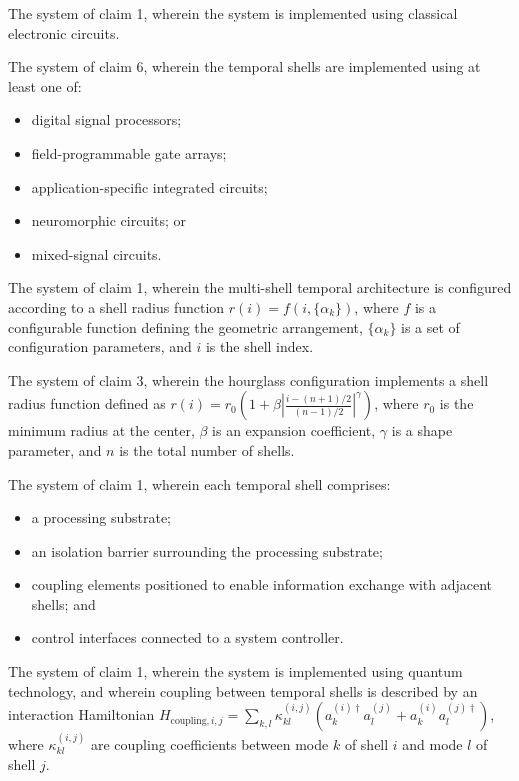 \documentclass[12pt,letterpaper]{article}
\begin{document}
\begin{patentclaims}
    \item The system of claim 1, wherein the system is implemented using classical electronic circuits.
    
    \item The system of claim 6, wherein the temporal shells are implemented using at least one of:
    \begin{itemize}[leftmargin=2em]
        \item digital signal processors;
        \item field-programmable gate arrays;
        \item application-specific integrated circuits;
        \item neuromorphic circuits; or
        \item mixed-signal circuits.
    \end{itemize}
    
    \item The system of claim 1, wherein the multi-shell temporal architecture is configured according to a shell radius function $r(i) = f(i, \{\alpha_k\})$, where $f$ is a configurable function defining the geometric arrangement, $\{\alpha_k\}$ is a set of configuration parameters, and $i$ is the shell index.
    
    \item The system of claim 3, wherein the hourglass configuration implements a shell radius function defined as $r(i) = r_0 \left(1 + \beta \left|\frac{i - (n+1)/2}{(n-1)/2}\right|^\gamma\right)$, where $r_0$ is the minimum radius at the center, $\beta$ is an expansion coefficient, $\gamma$ is a shape parameter, and $n$ is the total number of shells.
    
    \item The system of claim 1, wherein each temporal shell comprises:
    \begin{itemize}[leftmargin=2em]
        \item a processing substrate;
        \item an isolation barrier surrounding the processing substrate;
        \item coupling elements positioned to enable information exchange with adjacent shells; and
        \item control interfaces connected to a system controller.
    \end{itemize}
    
    \item The system of claim 1, wherein the system is implemented using quantum technology, and wherein coupling between temporal shells is described by an interaction Hamiltonian $H_{\text{coupling},i,j} = \sum_{k,l} \kappa_{kl}^{(i,j)} (a_k^{(i)\dagger} a_l^{(j)} + a_k^{(i)} a_l^{(j)\dagger})$, where $\kappa_{kl}^{(i,j)}$ are coupling coefficients between mode $k$ of shell $i$ and mode $l$ of shell $j$.
    

\end{patentclaims}
\end{document}
